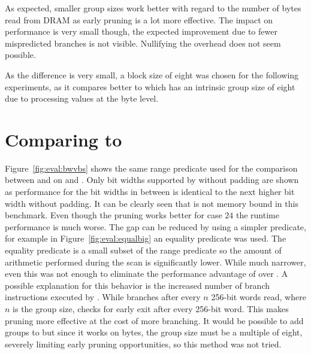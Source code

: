 As expected, smaller group sizes work better with regard to the number of bytes
read from DRAM as early pruning is a lot more effective. The impact on
performance is very small though, the expected improvement due to fewer
mispredicted branches is not visible. Nullifying the overhead does not seem
possible.

As the difference is very small, a block size of eight was chosen for the
following experiments, as it compares better to \bs{} which has an intrinsic
group size of eight due to processing values at the byte level.

\section{Comparing \bwv{} to \bs{}}

Figure~\ref{fig:eval:bwvbs} shows the same range predicate used for the
comparison between \simdscan{} and \bwv{} on \bs{} and \bwv{}. Only bit widths
supported by \bs{} without padding are shown as \bs{} performance for the bit
widths in between is identical to the next higher bit width without padding. It
can be clearly seen that \bs{} is not memory bound in this benchmark. Even
though the pruning works better for case $24$ the runtime performance is much
worse. The gap can be reduced by using a simpler predicate, for example in
Figure~\ref{fig:eval:equalbig} an equality predicate was used.  The equality
predicate is a small subset of the range predicate so the amount of arithmetic
performed during the scan is significantly lower.  While much narrower, even this
was not enough to eliminate the performance advantage of \bwv{} over \bs{}. A
possible explanation for this behavior is the increased number of branch
instructions executed by \bs{}. While \bwv{} branches after every $n$ 256-bit
words read, where $n$ is the group size, \bs{} checks for early exit after every
256-bit word. This makes pruning more effective at the cost of more branching.
It would be possible to add groups to \bs{} but since it works on bytes, the
group size must be a multiple of eight, severely limiting early pruning
opportunities, so this method was not tried.


